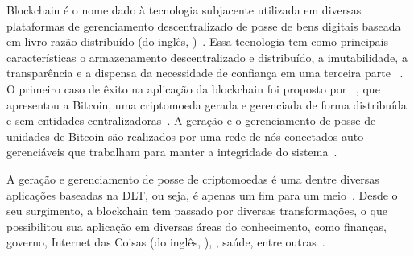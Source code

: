 \newcommand{\comando}[1]{\textbf{$\backslash$#1}}




Blockchain é o nome dado à tecnologia subjacente utilizada em diversas plataformas de gerenciamento descentralizado de posse de bens digitais baseada em livro-razão distribuído (do inglês,  )~\cite{kannengiesser2020trade-offs-acmcs}. Essa tecnologia tem como principais características o armazenamento descentralizado e distribuído, a imutabilidade, a transparência e a dispensa da necessidade de confiança em uma terceira parte ~\cite{fan2020performance, overview-dinh-2018}. O primeiro caso de êxito na aplicação da blockchain foi proposto por ~, que apresentou a Bitcoin, uma criptomoeda gerada e gerenciada de forma distribuída e sem entidades centralizadoras~\cite{zhang2019blockchain-security-acmcs}. A geração e o gerenciamento de posse de unidades de Bitcoin são realizados por uma rede de nós conectados auto-gerenciáveis que trabalham para manter a integridade do sistema~\cite{overview-dinh-2018}. 


A geração e gerenciamento de posse de criptomoedas é uma dentre diversas aplicações baseadas na DLT, ou seja, é apenas um fim para um meio~\cite{overview-blockchainbasic2018drescher}. Desde o seu surgimento, a blockchain tem passado por diversas transformações, o que possibilitou sua aplicação em diversas áreas do conhecimento, como finanças, governo, Internet das Coisas (do inglês, ), , saúde, entre outras~\cite{swan2015blockchain-book, maesa2020blockchain3.0, zhu2019iot-applications, salah2019review-blockchain-ai, erikson2020survey-health}. 

